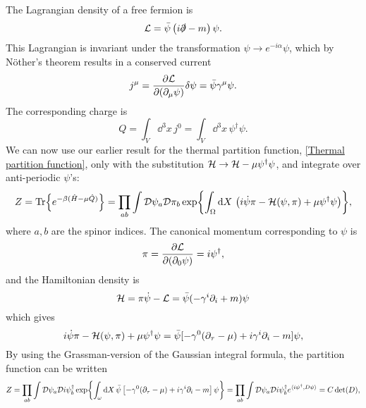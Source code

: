 The Lagrangian density of a free fermion is
\begin{equation}
    \mathcal{L} = \bar \psi \left( i \slashed{\partial} - m \right) \psi.
\end{equation}
This Lagrangian is invariant under the transformation $\psi \rightarrow e^{-i \alpha} \psi$, which by Nöther's theorem results in a conserved current
\begin{equation}
    j^\mu = \pdv{\mathcal{L}}{(\partial_\mu \psi)} \delta \psi=  \bar \psi \gamma^\mu \psi.
\end{equation}
The corresponding charge is 
\begin{equation}
    Q = \int_V \dd^3 x\, j^0 = \int_V \dd^3 x \, \psi^\dagger \psi.
\end{equation}
We can now use our earlier result for the thermal partition function, \autoref{Thermal partition function}, only with the substitution $\mathcal{H} \rightarrow \mathcal{H} - \mu \psi^\dagger \psi$, and integrate over anti-periodic $\psi$'s:
\begin{equation*}
    Z = \Tr{e^{-\beta(\hat H - \mu \hat Q)}}
    = \prod_{a b}\int \mathcal{D} \psi_a\mathcal{D} \pi_b \exp{
        \int_{\Omega} \dd X \, 
        \left(
            i\dot \psi \pi - \mathcal{H}(\psi, \pi) + \mu \psi^\dagger \psi
        \right)
    },
\end{equation*}
where $a, b$ are the spinor indices.
The canonical momentum corresponding to $\psi$ is
\begin{equation}
    \pi = \pdv{\mathcal{L}}{(\partial_0 \psi)} = i \psi^\dagger,
\end{equation}
and the Hamiltonian density is 
\begin{equation}
    \mathcal{H} = \pi \dot\psi - \mathcal{L}
    = \bar \psi ( - \gamma^i\partial_i + m) \psi
\end{equation}
which gives
\begin{equation}
    i \dot\psi \pi - \mathcal{H}(\psi, \pi) + \mu \psi^\dagger \psi
    = \bar\psi[-\gamma^0 (\partial_\tau - \mu) + i\gamma^i \partial_i - m] \psi,
\end{equation}
By using the Grassman-version of the Gaussian integral formula, the partition function can be written
\begin{align*}
    Z = \prod_{a b}\int \mathcal{D} \psi_a\mathcal{D} i\psi^\dagger_b 
    \exp{
        \int_\omega \dd X \, \bar \psi
        \left[
            -\gamma^0 (\partial_\tau -\mu)+ i \gamma^i \partial_i - m
        \right]
        \psi
    }
    = \prod_{a b}\int \mathcal{D} \psi_a\mathcal{D} i\psi^\dagger_b  e^{\langle i\psi^\dagger, D \psi\rangle} 
    = C \det(D),
\end{align*}
